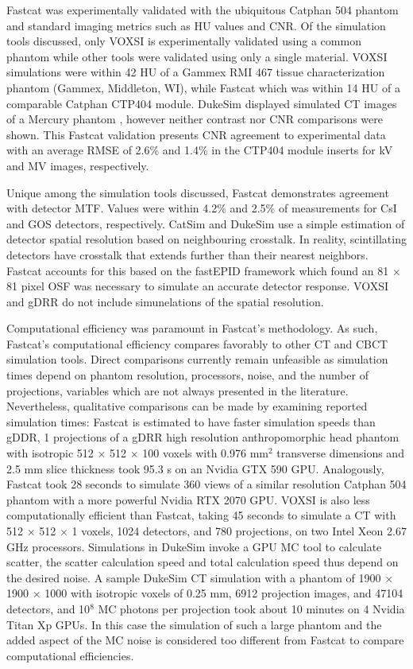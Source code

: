 Fastcat was experimentally validated with the ubiquitous Catphan 504 phantom and standard imaging metrics such as HU values and CNR. Of the simulation tools discussed, only VOXSI is experimentally validated using a common phantom while other tools were validated using only a single material. VOXSI simulations were within 42 HU of a Gammex RMI 467 tissue characterization phantom (Gammex, Middleton, WI), while Fastcat which was within 14 HU of a comparable Catphan CTP404 module. DukeSim displayed simulated CT images of a Mercury phantom \cite{Wilson2013ASystems}, however neither contrast nor CNR comparisons were shown. This Fastcat validation presents CNR agreement to experimental data with an average RMSE of 2.6\% and 1.4\% in the CTP404 module inserts for kV and MV images, respectively.

Unique among the simulation tools discussed, Fastcat demonstrates agreement with detector MTF. Values were within 4.2\% and 2.5\% of measurements for CsI and GOS detectors, respectively. CatSim and DukeSim use a simple estimation of detector spatial resolution based on neighbouring crosstalk. In reality, scintillating detectors have crosstalk that extends further than their nearest neighbors. Fastcat accounts for this based on the fastEPID framework \cite{Shi2019ADetectors.} which found an 81 $\times$ 81 pixel OSF was necessary to simulate an accurate detector response. VOXSI and gDRR do not include simunelations of the spatial resolution.

Computational efficiency was paramount in Fastcat’s methodology. As such, Fastcat’s computational efficiency compares favorably to other CT and CBCT simulation tools. Direct comparisons currently remain unfeasible as simulation times depend on phantom resolution, processors, noise, and the number of projections, variables which are not always presented in the literature. Nevertheless, qualitative comparisons can be made by examining reported simulation times: Fastcat is estimated to have faster simulation speeds than gDDR, 1 projections of a gDRR high resolution anthropomorphic head phantom with isotropic 512 $\times$ 512 $\times$ 100 voxels with 0.976 mm$^2$ transverse dimensions and 2.5 mm slice thickness took 95.3 s on an Nvidia GTX 590 GPU. Analogously, Fastcat took 28 seconds to simulate 360 views of a similar resolution Catphan 504 phantom with a more powerful Nvidia RTX 2070 GPU. VOXSI is also less computationally efficient than Fastcat, taking 45 seconds to simulate a CT with 512 $\times$ 512 $\times$ 1 voxels, 1024 detectors, and 780 projections, on two Intel Xeon 2.67 GHz processors. Simulations in DukeSim invoke a GPU MC tool to calculate scatter, the scatter calculation speed and total calculation speed thus depend on the desired noise. A sample DukeSim CT simulation with a phantom of 1900 $\times$ 1900 $\times$ 1000 with isotropic voxels of 0.25 mm, 6912 projection images, and 47104 detectors, and 10$^8$ MC photons per projection took about 10 minutes on 4 Nvidia Titan Xp GPUs. In this case the simulation of such a large phantom and the added aspect of the MC noise is considered too different from Fastcat to compare computational efficiencies.


